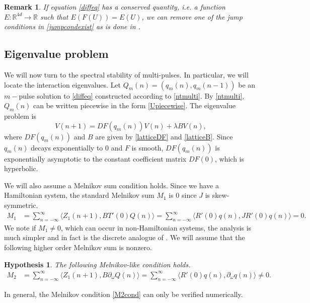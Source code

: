 \documentclass[12pt]{elsarticle}
\def\R{{\mathbb R}}
\newtheorem{hypothesis}{Hypothesis}
\newtheorem{remark}{Remark}
\begin{document}
\begin{remark}If equation \cref{diffeq} has a conserved quantity, i.e. a function $E: \R^{4d} \rightarrow \R$ such that $E(F(U)) = E(U)$, we can remove one of the jump conditions in \cref{jumpcondexist} as is done in \cite{SandstedeStrut}.
\end{remark}

\subsection{Eigenvalue problem}

We will now turn to the spectral stability of multi-pulses. In particular, we will locate the interaction eigenvalues. Let $Q_m(n) = (q_m(n), q_m(n-1))$ be an $m-$pulse solution to \cref{diffeq} constructed according to \cref{ntmulti}. By \cref{ntmulti}, $Q_m(n)$ can be written piecewise in the form \cref{Upiecewise}. The eigenvalue problem is
\begin{equation}\label{multiEVP}
V(n+1) = DF(q_m(n)) V(n) + \lambda B V(n),
\end{equation}
where $DF(q_m(n))$ and $B$ are given by \cref{latticeDF} and \cref{latticeB}. Since $q_m(n)$ decays exponentially to 0 and $F$ is smooth, $DF(q_m(n))$ is exponentially asymptotic to the constant coefficient matrix $DF(0)$, which is hyperbolic.

We will also assume a Melnikov sum condition holds. Since we have a Hamiltonian system, the standard Melnikov sum $M_1$ is 0 since $J$ is skew-symmetric.
\begin{align}\label{MelnikovM1zero}
M_1 &= \sum_{n=-\infty}^\infty \langle Z_1(n+1), B T'(0)Q(n) \rangle
= \sum_{n=-\infty}^\infty \langle R'(0)q(n), J R'(0)q(n) \rangle
= 0.
\end{align}
We note if $M_1 \neq 0$, which can occur in non-Hamiltonian systems, the analysis is much simpler and in fact is the discrete analogue of \cite{Sandstede1998}. We will assume that the following higher order Melnikov sum is nonzero.

\begin{hypothesis}\label{melnikovhyp}
The following Melnikov-like condition holds.
\begin{align}\label{M2cond}
M_2 &= \sum_{n=-\infty}^\infty \langle Z_1(n+1), B \partial_\omega Q(n) \rangle = \sum_{n=-\infty}^\infty \langle R'(0) q(n), \partial_\omega q(n) \rangle \neq 0 .
\end{align}
\end{hypothesis}
\noindent In general, the Melnikov condition \cref{M2cond} can only be verified numerically.
\end{document}
